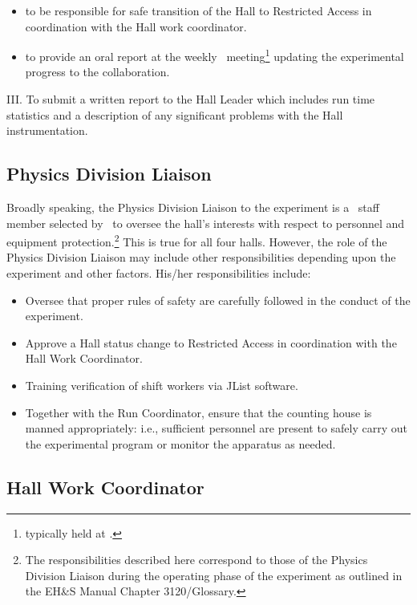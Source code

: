 \documentclass[10pt]{article}
\begin{document}
\begin{itemize}
\item to be responsible for safe transition of the Hall to
Restricted Access in coordination with the Hall work
coordinator.

\item to provide an oral report at the weekly \HALL\
meeting\footnote{typically held at {\HALLMEETINGTIME}.} updating the
experimental progress to the collaboration.


\end{itemize}

\noindent III. To submit a written report to the Hall Leader which includes
run time statistics and a description of any significant problems with the
Hall instrumentation.


\subsection{Physics Division Liaison}

Broadly speaking, the Physics Division Liaison to the experiment
is a \HALL\ staff member selected by \HALLLEADER\
to oversee the hall's interests with respect to personnel and equipment
protection.\footnote{The responsibilities described here correspond
to those of the Physics Division Liaison during
the operating phase of the experiment as outlined in the
EH\&S Manual Chapter 3120/Glossary.}
This is true for all four halls. However, the role of
the Physics Division Liaison may include other responsibilities
depending upon the experiment and other factors. His/her responsibilities
include:
\begin{itemize}
\item Oversee that proper rules of safety are carefully followed in the
conduct of the experiment.
\item Approve a Hall status change to Restricted Access in coordination
with the Hall Work Coordinator.
\item Training verification of shift workers via JList software.
\item Together with the Run Coordinator,
ensure that the counting house is manned appropriately: i.e.,
sufficient personnel are present to safely carry out the experimental
program or monitor the apparatus as needed.
\end{itemize}

\subsection{Hall Work Coordinator}
\end{document}

